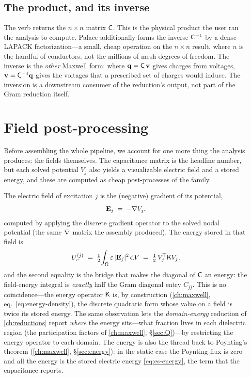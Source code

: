 \subsection{The product, and its inverse}

The verb returns the $n\times n$ matrix $\mathsf{C}$. This is the physical product the
user ran the analysis to compute. Palace additionally forms the inverse
$\mathsf{C}^{-1}$ by a dense LAPACK factorization---a small, cheap operation on the
$n\times n$ result, where $n$ is the handful of conductors, not the millions of
mesh degrees of freedom. The inverse is the \emph{other} Maxwell form: where
$\mathbf q=\mathsf{C}\,\mathbf v$ gives charges from voltages, $\mathbf
v=\mathsf{C}^{-1}\mathbf q$ gives the voltages that a prescribed set of charges would
induce. The inversion is a downstream consumer of the reduction's output, not part
of the Gram reduction itself.

\section{Field post-processing}
\label{sec:es-fields}

Before assembling the whole pipeline, we account for one more thing the analysis
produces: the fields themselves. The capacitance matrix is the headline number, but
each solved potential $V_j$ also yields a visualizable electric field and a stored
energy, and these are computed as cheap post-processes of the family.

The electric field of excitation $j$ is the (negative) gradient of its potential,
\begin{equation}
  \mathbf{E}_j \;=\; -\nabla V_j ,
  \label{eq:es-Efield}
\end{equation}
computed by applying the discrete gradient operator to the solved nodal potential
(the same $\nabla$ matrix the assembly produced). The energy stored in that field is
\begin{equation}
  U_e^{(j)} \;=\; \tfrac12\!\int_\Omega \varepsilon\,\lvert\mathbf{E}_j\rvert^2 \,\mathrm{d}V
            \;=\; \tfrac12\,V_j^{\!\top}\mathsf{K} V_j ,
  \label{eq:es-energy}
\end{equation}
and the second equality is the bridge that makes the diagonal of $\mathsf{C}$ an energy:
the field-energy integral is \emph{exactly} half the Gram diagonal entry $C_{jj}$.
This is no coincidence---the energy operator $\mathsf{K}$ is, by construction
(\cref{ch:maxwell}, eq.~\eqref{eq:energy-density}), the discrete quadratic form
whose value on a field is twice its stored energy. The same observation lets the
\emph{domain-energy} reduction of \cref{ch:reductions} report \emph{where} the energy
sits---what fraction lives in each dielectric region (the participation factors of
\cref{ch:maxwell}, \S\ref{sec:Q})---by restricting the energy operator to each
domain. The energy is also the thread back to Poynting's theorem (\cref{ch:maxwell},
\S\ref{sec:energy}): in the static case the Poynting flux is zero and all the energy
is the stored electric energy \cref{eq:es-energy}, the term that the capacitance
reports.

